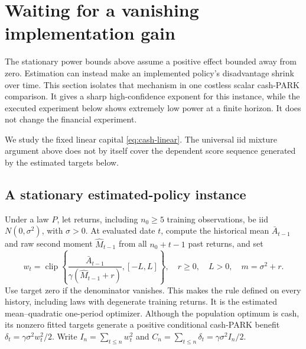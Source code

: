 \section{Waiting for a vanishing implementation gain}
\label{sec:vanishing}
The stationary power bounds above assume a positive effect bounded away from
zero. Estimation can instead make an implemented policy's disadvantage shrink
over time. This section isolates that mechanism in one costless scalar
cash-PARK comparison. It gives a sharp high-confidence exponent for this
instance, while the executed experiment below shows extremely low power at
a finite horizon. It does not change the financial experiment.

We study the fixed linear capital \eqref{eq:cash-linear}. The universal iid
mixture argument above does not by itself cover the dependent score sequence
generated by the estimated targets below.

\subsection{A stationary estimated-policy instance}
Under a law $P$, let returns, including $n_0\ge5$ training observations, be
iid $N(0,\sigma^2)$, with $\sigma>0$. At evaluated date $t$, compute the
historical mean $\bar A_{t-1}$ and raw second moment $\widehat M_{t-1}$ from
all $n_0+t-1$ past returns, and set
\begin{equation}
 w_t=\operatorname{clip}\!\left\{
 \frac{\bar A_{t-1}}{\gamma(\widehat M_{t-1}+r)},[-L,L]\right\},
 \quad r\ge0,\quad L>0,\quad m=\sigma^2+r.
 \label{eq:vanishing-policy}
\end{equation}
Use target zero if the denominator vanishes. This makes the rule defined on
every history, including laws with degenerate training returns.
It is the estimated mean--quadratic one-period optimizer. Although the
population optimum is cash, its nonzero fitted targets generate a positive
conditional cash-PARK benefit $\delta_t=\gamma\sigma^2w_t^2/2$.
Write $I_n=\sum_{t\le n}w_t^2$ and
$C_n=\sum_{t\le n}\delta_t=\gamma\sigma^2I_n/2$.

